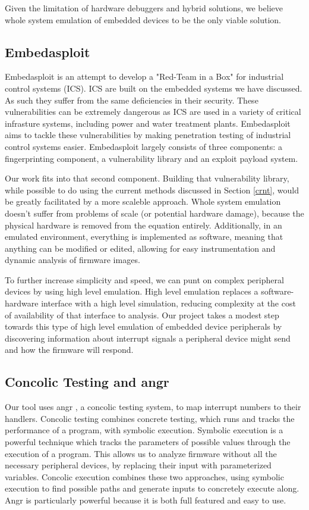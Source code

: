 \documentclass[letterpaper, 10 pt, conference]{ieeeconf}
\begin{document}
Given the limitation of hardware debuggers and hybrid solutions, we believe whole system emulation of embedded devices to be the only viable solution.

\subsection{Embedasploit} \label{embd}%
Embedasploit is an attempt to develop a "Red-Team in a Box" for industrial control systems (ICS). ICS are built on the embedded systems we have discussed. As such they suffer from the same deficiencies in their security. These vulnerabilities can be extremely dangerous as ICS are used in a variety of critical infrasture systems, including power and water treatment plants. Embedasploit aims to tackle these vulnerabilities by making penetration testing of industrial control systems easier. Embedasploit largely consists of three components: a fingerprinting component, a vulnerability library and an exploit payload system. 

Our work fits into that second component. Building that vulnerability library, while possible to do using the current methods discussed in Section \ref{crnt}, would be greatly facilitated by a more scaleble approach. Whole system emulation doesn't suffer from problems of scale (or potential hardware damage), because the physical hardware is removed from the equation entirely. Additionally, in an emulated environment, everything is implemented as software, meaning that anything can be modified or edited, allowing for easy instrumentation and dynamic analysis of firmware images. 

To further increase simplicity and speed, we can punt on complex peripheral devices by using high level emulation. High level emulation replaces a software-hardware interface with a high level simulation, reducing complexity at the cost of availability of that interface to analysis. Our project takes a modest step towards this type of high level emulation of embedded device peripherals by discovering information about interrupt signals a peripheral device might send and how the firmware will respond.

\subsection{Concolic Testing and angr} \label{conc} %
Our tool uses angr \cite{angr}, a concolic testing system, to map interrupt numbers to their handlers. Concolic testing combines concrete testing, which runs and tracks the performance of a program, with symbolic execution. Symbolic execution is a powerful technique which tracks the parameters of possible values through the execution of a program. This allows us to analyze firmware without all the necessary peripheral devices, by replacing their input with parameterized variables. Concolic execution combines these two approaches, using symbolic execution to find possible paths and generate inputs to concretely execute along. Angr is particularly powerful because it is both full featured and easy to use. 
\end{document}
